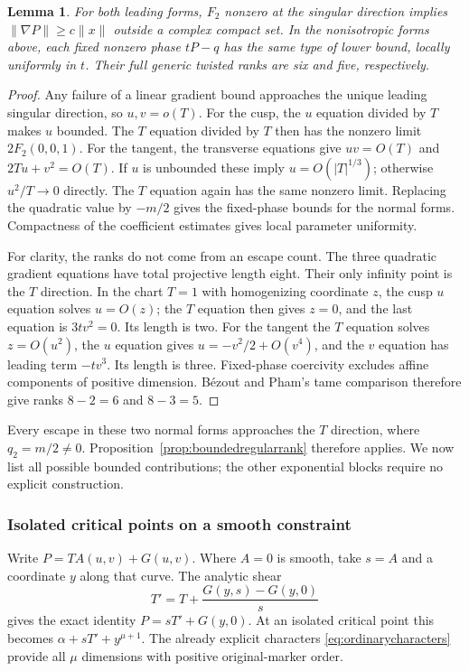 \documentclass[11pt]{article}
\newtheorem{lemma}[theorem]{Lemma}
\theoremstyle{definition}\newtheorem{definition}[theorem]{Definition}
\theoremstyle{remark}\newtheorem{remark}[theorem]{Remark}
\begin{document}
\begin{lemma}\label{lem:cusptangentgate}
For both leading forms, $F_2$ nonzero at the singular direction
implies $\|\nabla P\|\ge c\|x\|$ outside a complex compact set.
In the nonisotropic forms above, each fixed nonzero phase
$tP-q$ has the same type of lower bound, locally uniformly in
$t$. Their full generic twisted ranks are six and five,
respectively.
\end{lemma}
\begin{proof}
Any failure of a linear gradient bound approaches the unique
leading singular direction, so $u,v=o(T)$. For the cusp,
the $u$ equation divided by $T$ makes $u$ bounded. The $T$
equation divided by $T$ then has the nonzero limit $2F_2(0,0,1)$.
For the tangent, the transverse equations give
$uv=O(T)$ and $2Tu+v^2=O(T)$. If $u$ is unbounded these imply
$u=O(|T|^{1/3})$; otherwise $u^2/T\to0$ directly. The $T$
equation again has the same nonzero limit. Replacing the quadratic value by $-m/2$
gives the fixed-phase bounds for the normal forms. Compactness
of the coefficient estimates gives local parameter uniformity.

For clarity, the ranks do not come from an escape count. The
three quadratic gradient equations have total projective length
eight. Their only infinity point is the $T$ direction. In the
chart $T=1$ with homogenizing coordinate $z$, the cusp $u$
equation solves $u=O(z)$; the $T$ equation then gives $z=0$,
and the last equation is $3tv^2=0$. Its length is two. For
the tangent the $T$ equation solves $z=O(u^2)$, the $u$ equation
gives $u=-v^2/2+O(v^4)$, and the $v$ equation has leading term
$-tv^3$. Its length is three. Fixed-phase coercivity excludes
affine components of positive dimension. B\'ezout and Pham's
tame comparison therefore give ranks $8-2=6$ and $8-3=5$.
\end{proof}

Every escape in these two normal forms approaches the $T$
direction, where $q_2=m/2\ne0$. Proposition~\ref{prop:boundedregularrank}
therefore applies. We now list all possible bounded contributions;
the other exponential blocks require no explicit construction.

\subsubsection*{Isolated critical points on a smooth constraint}

Write $P=T A(u,v)+G(u,v)$. Where $A=0$ is smooth, take $s=A$
and a coordinate $y$ along that curve. The analytic shear
\[
 T'=T+\frac{G(y,s)-G(y,0)}s
\]
gives the exact identity $P=sT'+G(y,0)$. At an isolated critical
point this becomes $\alpha+sT'+y^{\mu+1}$. The already explicit
characters \eqref{eq:ordinarycharacters} provide all $\mu$
dimensions with positive original-marker order.
\end{document}
